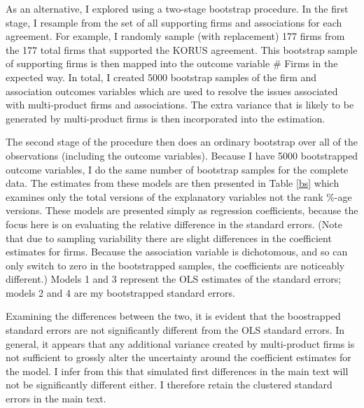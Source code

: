 \documentclass[hidelinks,12pt,letter]{article}
\begin{document}
As an alternative, I explored using a two-stage bootstrap procedure. In the first stage, I resample from the set of all supporting firms and associations for each agreement. For example, I randomly sample (with replacement) 177 firms from the 177 total firms that supported the KORUS agreement. This bootstrap sample of supporting firms is then mapped into the outcome variable $\#$ Firms in the expected way. In total, I created 5000 bootstrap samples of the firm and association outcomes variables which are used to resolve the issues associated with multi-product firms and associations. The extra variance that is likely to be generated by multi-product firms is then incorporated into the estimation.

The second stage of the procedure then does an ordinary bootstrap over all of the observations (including the outcome variables). Because I have 5000 bootstrapped outcome variables, I do the same number of bootstrap samples for the complete data. The estimates from these models are then presented in Table \ref{bs} which examines only the total versions of the explanatory variables not the rank \%-age versions. These models are presented simply as regression coefficients, because the focus here is on evaluating the relative difference in the standard errors. (Note that due to sampling variability there are slight differences in the coefficient estimates for firms. Because the association variable is dichotomous, and so can only switch to zero in the bootstrapped samples, the coefficients are noticeably different.) Models 1 and 3 represent the OLS estimates of the standard errors; models 2 and 4 are my bootstrapped standard errors. 

Examining the differences between the two, it is evident that the boostrapped standard errors are not significantly different from the OLS standard errors. In general, it appears that any additional variance created by multi-product firms is not sufficient to grossly alter the uncertainty around the coefficient estimates for the model. I infer from this that simulated first differences in the main text will not be significantly different either. I therefore retain the clustered standard errors in the main text.
\end{document}
